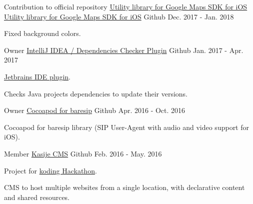 \begin{cventries}
  \cventry
    {Contribution to official repository \href{https://github.com/googlemaps/google-maps-ios-utils}{Utility library for Google Maps SDK for iOS}} %
    {\faMapMarker \hphantom{-} \href{https://github.com/zp1ke/google-maps-ios-utils}{Utility library for Google Maps SDK for iOS}} %
    {\faGithubSquare\acvHeaderIconSep Github} %
    {Dec. 2017 - Jan. 2018} %
    {
      \begin{cvitems} %
        \item {Fixed background colors.}
      \end{cvitems}
    }

  \cventry
    {Owner} %
    {\href{https://github.com/zp1ke/deps-checker}{IntelliJ IDEA / Dependencies Checker Plugin}} %
    {\faGithubSquare\acvHeaderIconSep Github} %
    {Jan. 2017 - Apr. 2017} %
    {
      \begin{cvitems} %
        \item {\href{https://plugins.jetbrains.com/plugin/9481-java-dependencies-checker}{Jetbrains IDE plugin}.}
        \item {Checks Java projects dependencies to update their versions.}
      \end{cvitems}
    }

  \cventry
    {Owner} %
    {\faMobile \hphantom{-} \href{https://github.com/zp1ke/taresip}{Cocoapod for baresip}} %
    {\faGithubSquare\acvHeaderIconSep Github} %
    {Apr. 2016 - Oct. 2016} %
    {
      \begin{cvitems} %
        \item {Cocoapod for baresip library (SIP User-Agent with audio and video support for iOS).}
      \end{cvitems}
    }

  \cventry
    {Member} %
    {\href{https://github.com/touwolf/kasije}{Kasije CMS}} %
    {\faGithubSquare\acvHeaderIconSep Github} %
    {Feb. 2016 - May. 2016} %
    {
      \begin{cvitems} %
        \item {Project for \href{https://www.koding.com/Hackathon}{koding Hackathon}.}
        \item {CMS to host multiple websites from a single location, with declarative content and shared resources.}
      \end{cvitems}
    }


\end{cventries}
